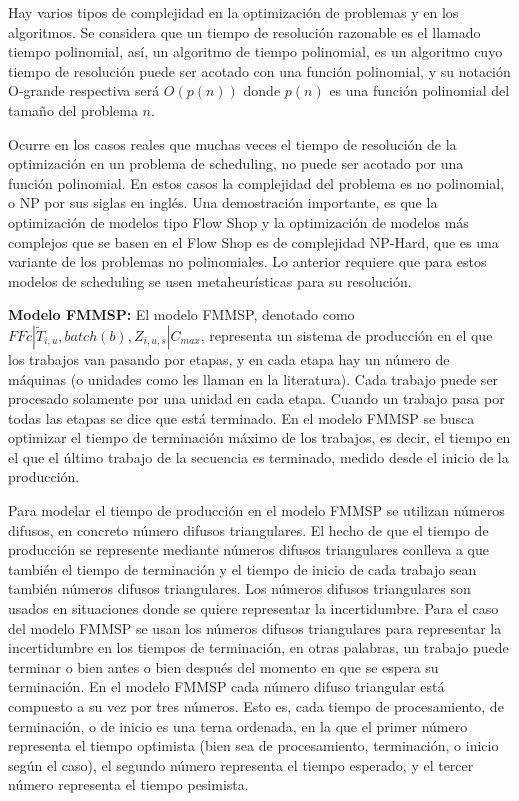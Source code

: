 \documentclass{article}
\def\notac_modelo{$FFc | \tilde{T}_{i, u}, batch(b), Z_{i, u, s} | C_{max}$}
\begin{document}
\vspace{\baselineskip}
Hay varios tipos de complejidad en la optimización de problemas y en los algoritmos. Se considera que un tiempo de resolución razonable es el llamado tiempo polinomial, así, un algoritmo de tiempo polinomial, es un algoritmo cuyo tiempo de resolución puede ser acotado con una función polinomial, y su notación O-grande respectiva será $O(p(n))$ donde $p(n)$ es una función polinomial del tamaño del problema $n$. \autocite{metaTalbi}

\vspace{\baselineskip}
Ocurre en los casos reales que muchas veces el tiempo de resolución de la optimización en un problema de scheduling, no puede ser acotado por una función polinomial. En estos casos la complejidad del problema es no polinomial, o NP por sus siglas en inglés. Una demostración importante, es que la optimización de modelos tipo Flow Shop y la optimización de modelos más complejos que se basen en el Flow Shop es de complejidad NP-Hard, que es una variante de los problemas no polinomiales. Lo anterior requiere que para estos modelos de scheduling se usen metaheurísticas para su resolución. \autocite{flowCompl}

\vspace{\baselineskip}
\textbf{Modelo FMMSP:} El modelo FMMSP, denotado como \linebreak \notac_modelo, representa un sistema de producción en el que los trabajos van pasando por etapas, y en cada etapa hay un número de máquinas (o unidades como les llaman en la literatura). Cada trabajo puede ser procesado solamente por una unidad en cada etapa. Cuando un trabajo pasa por todas las etapas se dice que está terminado. En el modelo FMMSP se busca optimizar el tiempo de terminación máximo de los trabajos, es decir, el tiempo en el que el último trabajo de la secuencia es terminado, medido desde el inicio de la producción. \autocite{modFMMSP}

\vspace{\baselineskip}
Para modelar el tiempo de producción en el modelo FMMSP se utilizan números difusos, en concreto número difusos triangulares. El hecho de que el tiempo de producción se represente mediante números difusos triangulares conlleva a que también el tiempo de terminación y el tiempo de inicio de cada trabajo sean también números difusos triangulares. Los números difusos triangulares son usados en situaciones donde se quiere representar la incertidumbre. Para el caso del modelo FMMSP se usan los números difusos triangulares para representar la incertidumbre en los tiempos de terminación, en otras palabras, un trabajo puede terminar o bien antes o bien después del momento en que se espera su terminación. En el modelo FMMSP cada número difuso triangular está compuesto a su vez por tres números. Esto es, cada tiempo de procesamiento, de terminación, o de inicio es una terna ordenada, en la que el primer número representa el tiempo optimista (bien sea de procesamiento, terminación, o inicio según el caso), el segundo número representa el tiempo esperado, y el tercer número representa el tiempo pesimista. \autocite{modFMMSP}
\end{document}
